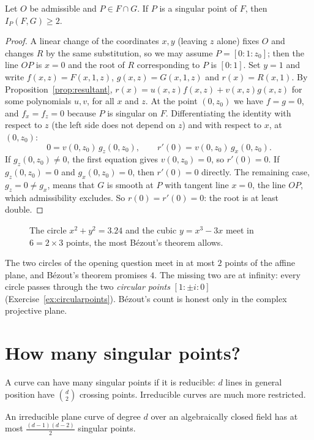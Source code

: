 \begin{lemma}\label{lem:singularmult}
Let $O$ be admissible and $P\in F\cap G$. If $P$ is a singular point of $F$, then $I_P(F,G)\ge2$.
\end{lemma}

\begin{proof}
A linear change of the coordinates $x,y$ (leaving $z$ alone) fixes $O$ and changes $R$ by the same substitution, so we may assume $P=[0:1:z_0]$; then the
line $OP$ is $x=0$ and the root of $R$ corresponding to $P$ is $[0:1]$. Set $y=1$ and write $f(x,z)=F(x,1,z)$, $g(x,z)=G(x,1,z)$ and $r(x)=R(x,1)$. By
Proposition~\ref{prop:resultant}, $r(x)=u(x,z)f(x,z)+v(x,z)g(x,z)$ for some polynomials $u,v$, for all $x$ and $z$. At the point $(0,z_0)$ we have $f=g=0$, and
$f_x=f_z=0$ because $P$ is singular on $F$. Differentiating the identity with respect to $z$ (the left side does not depend on $z$) and with respect to
$x$, at $(0,z_0)$:
\[
0=v(0,z_0)\,g_z(0,z_0),\qquad r'(0)=v(0,z_0)\,g_x(0,z_0).
\]
If $g_z(0,z_0)\ne0$, the first equation gives $v(0,z_0)=0$, so $r'(0)=0$. If $g_z(0,z_0)=0$ and $g_x(0,z_0)=0$, then $r'(0)=0$ directly. The remaining case,
$g_z=0\ne g_x$, means that $G$ is smooth at $P$ with tangent line $x=0$, the line $OP$, which admissibility excludes. So $r(0)=r'(0)=0$: the root is at
least double.
\end{proof}

\begin{figure}[ht]
\centering
{}
\caption{The circle $x^2+y^2=3.24$ and the cubic $y=x^3-3x$ meet in $6=2\times3$ points, the most B\'ezout's theorem allows.}
\label{fig:bezout}
\end{figure}

The two circles of the opening question meet in at most $2$ points of the affine plane, and B\'ezout's theorem promises $4$. The missing two are at
infinity: every circle passes through the two \emph{circular points} $[1:\pm i:0]$ (Exercise~\ref{ex:circularpoints}). B\'ezout's count is honest only
in the complex projective plane.

\section{How many singular points?}

A curve can have many singular points if it is reducible: $d$ lines in general position have $\binom d2$ crossing points. Irreducible curves are
much more restricted.

\begin{theorem}\label{thm:singbound}
An irreducible plane curve of degree $d$ over an algebraically closed field has at most $\frac{(d-1)(d-2)}2$ singular points.
\end{theorem}

